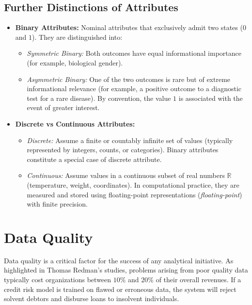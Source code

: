 \subsection{Further Distinctions of Attributes}
\begin{itemize}
    \item \textbf{Binary Attributes:} Nominal attributes that exclusively admit two states ($0$ and $1$). They are distinguished into:
    \begin{itemize}
        \item \textit{Symmetric Binary:} Both outcomes have equal informational importance (for example, biological gender).
        \item \textit{Asymmetric Binary:} One of the two outcomes is rare but of extreme informational relevance (for example, a positive outcome to a diagnostic test for a rare disease). By convention, the value $1$ is associated with the event of greater interest.
    \end{itemize}
    \item \textbf{Discrete vs Continuous Attributes:}
    \begin{itemize}
        \item \textit{Discrete:} Assume a finite or countably infinite set of values (typically represented by integers, counts, or categories). Binary attributes constitute a special case of discrete attribute.
        \item \textit{Continuous:} Assume values in a continuous subset of real numbers $\mathbb{R}$ (temperature, weight, coordinates). In computational practice, they are measured and stored using floating-point representations (\textit{floating-point}) with finite precision.
    \end{itemize}
\end{itemize}

\section{Data Quality}

Data quality is a critical factor for the success of any analytical initiative. As highlighted in Thomas Redman's studies, problems arising from poor quality data typically cost organizations between $10\%$ and $20\%$ of their overall revenues.
If a credit risk model is trained on flawed or erroneous data, the system will reject solvent debtors and disburse loans to insolvent individuals.

